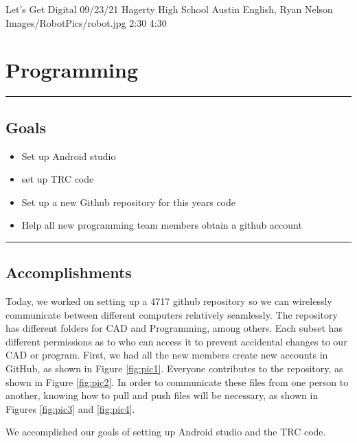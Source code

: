 \insertmeeting 
	{Let's Get Digital} 
	{09/23/21}
	{Hagerty High School}
	{Austin English, Ryan Nelson}
	{Images/RobotPics/robot.jpg}
	{2:30}
  {4:30}
	
\section*{Programming}
\noindent\hfil\rule{\textwidth}{.4pt}\hfil
\subsection*{Goals}
\begin{itemize}
    \item Set up Android studio
    \item set up TRC code   
    \item Set up a new Github repository for this years code
    \item Help all new programming team members obtain a github account 
\end{itemize} 

\noindent\hfil\rule{\textwidth}{.4pt}\hfil

\subsection*{Accomplishments}
Today, we worked on setting up a 4717 github repository so we can wirelessly communicate between different computers relatively seamlessly. The repository has different folders for CAD and Programming, among others. Each subset has different permissions as to who can access it to prevent accidental changes to our CAD or program. First, we had all the new members create new accounts in GitHub, as shown in Figure \ref{fig:pic1}. Everyone contributes to the repository, as shown in Figure \ref{fig:pic2}. In order to communicate these files from one person to another, knowing how to pull and push files will be necessary, as shown in Figures \ref{fig:pic3} and \ref{fig:pic4}. 
 
We accomplished our goals of setting up Android studio and the TRC code.
 

